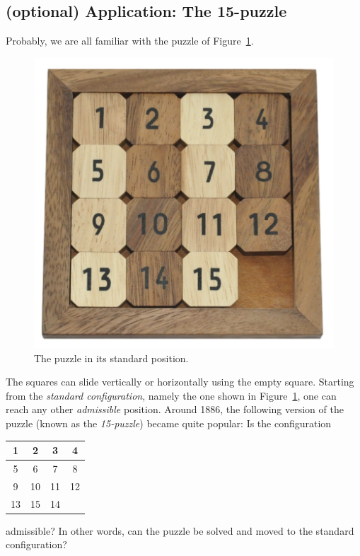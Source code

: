 \subsection{(optional) Application: The 15-puzzle}

Probably, we are all familiar with the puzzle of Figure~\ref{fig:toy}. 

\begin{figure}[ht]
    \centering
    \includegraphics[width=0.25\linewidth]{images/15puzzle.jpg}
    \caption{The puzzle in its standard position.}
    \label{fig:toy}
\end{figure}


The squares can slide vertically or horizontally using the empty square. Starting from the \emph{standard configuration}, 
namely the one shown in Figure~\ref{fig:toy}, one can reach any other \emph{admissible} position.
Around 1886, the following version of the puzzle (known as the \emph{15-puzzle}) 
became quite popular: Is the configuration 
\bigskip 
    \begin{center}
        \begin{tabular}{|c|c|c|c|}
            \hline
            1 & 2 & 3 & 4\\
            \hline
            5 & 6 & 7 & 8\\
            \hline
            9 & 10 & 11 & 12\\
            \hline
            13 & 15 & 14 & \\
            \hline
        \end{tabular}
    \end{center}
\bigskip 
admissible? In other words, can the puzzle be solved and moved to the standard configuration? 


